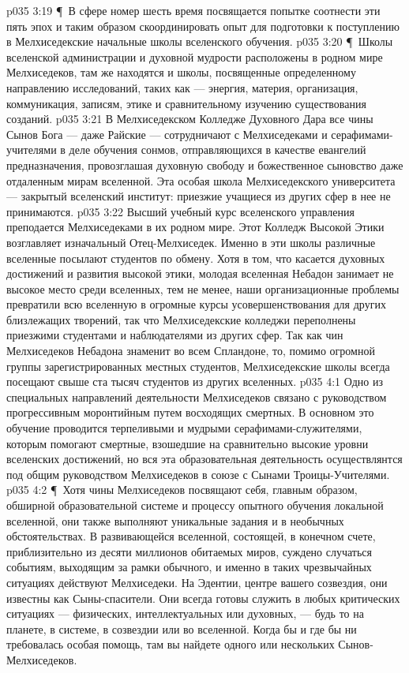 \vs p035 3:19 \P\ \bibnobreakspace В сфере номер шесть время посвящается попытке соотнести эти пять эпох и таким образом скоординировать опыт для подготовки к поступлению в Мелхиседекские начальные школы вселенского обучения.
\vs p035 3:20 \P\ Школы вселенской администрации и духовной мудрости расположены в родном мире Мелхиседеков, там же находятся и школы, посвященные определенному направлению исследований, таких как --- энергия, материя, организация, коммуникация, записям, этике и сравнительному изучению существования созданий.
\vs p035 3:21 В Мелхиседекском Колледже Духовного Дара все чины Сынов Бога --- даже Райские --- сотрудничают с Мелхиседеками и серафимами\hyp{}учителями в деле обучения сонмов, отправляющихся в качестве евангелий предназначения, провозглашая духовную свободу и божественное сыновство даже отдаленным мирам вселенной. Эта особая школа Мелхиседекского университета --- закрытый вселенский институт: приезжие учащиеся из других сфер в нее не принимаются.
\vs p035 3:22 Высший учебный курс вселенского управления преподается Мелхиседеками в их родном мире. Этот Колледж Высокой Этики возглавляет изначальный Отец\hyp{}Мелхиседек. Именно в эти школы различные вселенные посылают студентов по обмену. Хотя в том, что касается духовных достижений и развития высокой этики, молодая вселенная Небадон занимает не высокое место среди вселенных, тем не менее, наши организационные проблемы превратили всю вселенную в огромные курсы усовершенствования для других близлежащих творений, так что Мелхиседекские колледжи переполнены приезжими студентами и наблюдателями из других сфер. Так как чин Мелхиседеков Небадона знаменит во всем Спландоне, то, помимо огромной группы зарегистрированных местных студентов, Мелхиседекские школы всегда посещают свыше ста тысяч студентов из других вселенных.
\vs p035 4:1 Одно из специальных направлений деятельности Мелхиседеков связано с руководством прогрессивным моронтийным путем восходящих смертных. В основном это обучение проводится терпеливыми и мудрыми серафимами\hyp{}служителями, которым помогают смертные, взошедшие на сравнительно высокие уровни вселенских достижений, но вся эта образовательная деятельность осуществлянтся под общим руководством Мелхиседеков в союзе с Сынами Троицы\hyp{}Учителями.
\vs p035 4:2 \P\ Хотя чины Мелхиседеков посвящают себя, главным образом, обширной образовательной системе и процессу опытного обучения локальной вселенной, они также выполняют уникальные задания и в необычных обстоятельствах. В развивающейся вселенной, состоящей, в конечном счете, приблизительно из десяти миллионов обитаемых миров, суждено случаться событиям, выходящим за рамки обычного, и именно в таких чрезвычайных ситуациях действуют Мелхиседеки. На Эдентии, центре вашего созвездия, они известны как Сыны\hyp{}спасители. Они всегда готовы служить в любых критических ситуациях --- физических, интеллектуальных или духовных, --- будь то на планете, в системе, в созвездии или во вселенной. Когда бы и где бы ни требовалась особая помощь, там вы найдете одного или нескольких Сынов\hyp{}Мелхиседеков.
